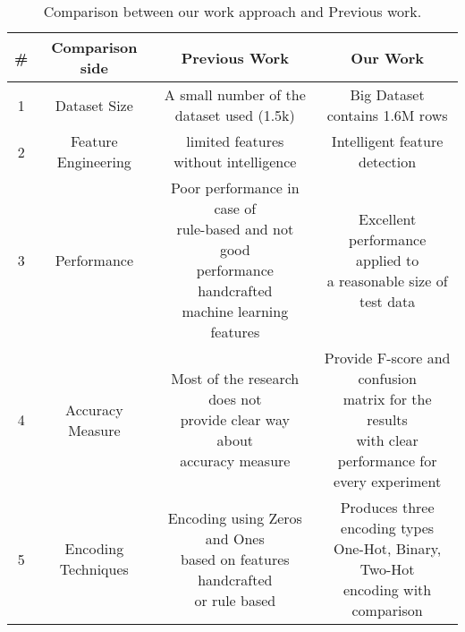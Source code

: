 \begin{table}[H]
  \centering
  \begin{tabular}{|c|c|c|c|}
    \hline
    \textbf{\#} & \textbf{Comparison side} & \textbf{Previous Work} & \textbf{Our Work} \\
    \hline
    1 & Dataset Size & A small number of the dataset used (1.5k) & Big Dataset contains 1.6M rows    \\
        \hline
    2 & Feature Engineering & limited features without intelligence  & Intelligent feature detection   \\
        \hline
    3 & Performance & \makecell{Poor performance in case of\\ rule-based and not good \\performance handcrafted \\machine learning features}  & \makecell{Excellent performance applied to \\a reasonable size of test data}  \\

    \hline
        4 & Accuracy Measure & \makecell{Most of the research does not \\provide clear way about \\accuracy measure }  & \makecell{Provide F-score and confusion\\ matrix for the results\\ with clear performance for\\ every experiment}  \\

    \hline
    5 & Encoding Techniques & \makecell{Encoding using Zeros and Ones \\ based on features handcrafted \\or rule based }    & \makecell{Produces three encoding types\\  One-Hot, Binary, Two-Hot \\encoding with comparison }  \\

    \hline
 \end{tabular}
  \caption{Comparison between our work approach and Previous work. }\label{arud:feet}
\end{table}



